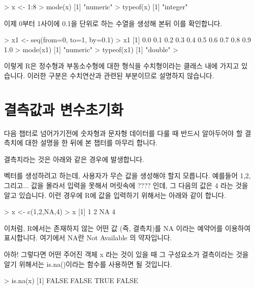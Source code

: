 \documentclass{book}
\begin{document}
\begin{Schunk}
\begin{Soutput}
> x <- 1:8
> mode(x)
[1] "numeric"
> typeof(x)
[1] "integer"
\end{Soutput}
\end{Schunk}

이제 0부터 1사이에 0.1을 단위로 하는 수열을 생성해 본뒤 이를 확인합니다. 

\begin{Schunk}
\begin{Soutput}
> x1 <- seq(from=0, to=1, by=0.1)
> x1
 [1] 0.0 0.1 0.2 0.3 0.4 0.5 0.6 0.7 0.8 0.9 1.0
> mode(x1)
[1] "numeric"
> typeof(x1)
[1] "double"
> 
\end{Soutput}
\end{Schunk}

이렇게 R은 정수형과 부동소수형에 대한 형식을 수치형이라는 클래스 내에 가지고 있습니다. 
이러한 구분은 수치연산과 관련된 부분이므로 설명하지 않습니다. 

\section{결측값과 변수초기화} 

다음 챕터로 넘어가기전에 숫자형과 문자형 데이터를 다룰 때 반드시 알아두어야 할 결측치에 대한 설명을 한 뒤에 본 챕터를 마무리 합니다.

결측치라는 것은 아래와 같은 경우에 발생합니다. 

벡터를 생성하려고 하는데, 사용자가 무슨 값을 생성해야 할지 모릅니다. 
예를들어 1,2, 그리고... 값을 몰라서 입력을 못해서 머릿속에 ???? 인데, 그 다음의 값은 4 라는 것을 알고 있습니다. 
이런 경우에 R에 값을 입력하기 위해서는 아래와 같이 합니다. 

\begin{Schunk}
\begin{Soutput}
> x <- c(1,2,NA,4)
> x
[1]  1  2 NA  4
\end{Soutput}
\end{Schunk}

이처럼, R에서는 존재하지 않는 어떤 값 (즉, 결측치)를 NA 이라는 예약어를 이용하여 표시합니다. 
여기에서 NA란 Not Available 의 약자입니다. 

아하! 그렇다면 어떤 주어진 객체 x 라는 것이 있을 때 그 구성요소가 결측이라는 것을 알기 위해서는 is.na()이라는 함수를 사용하면 될 것입니다. 

\begin{Schunk}
\begin{Soutput}
> is.na(x)
[1] FALSE FALSE  TRUE FALSE
\end{Soutput}
\end{Schunk}
\end{document}
